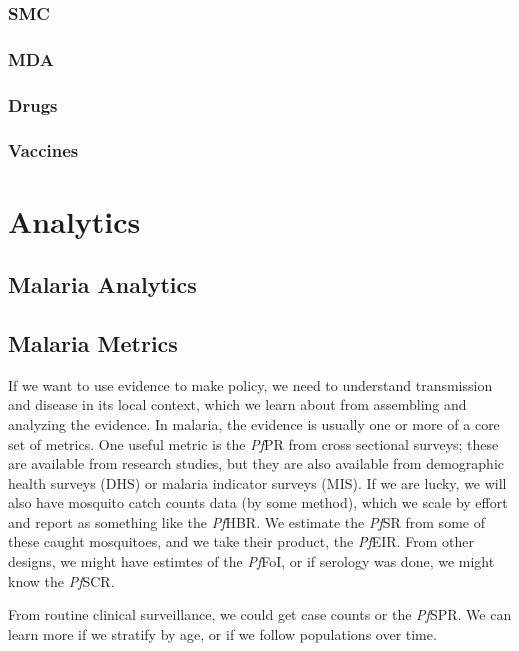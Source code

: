 \documentclass[
]{book}
\begin{document}
\section{SMC}\label{smc}

\section{MDA}\label{mda}

\section{Drugs}\label{drugs}

\section{Vaccines}\label{vaccines}

\part{Analytics}\label{part-analytics}

\chapter{Malaria Analytics}\label{malaria-analytics}

\chapter{Malaria Metrics}\label{malaria-metrics}

If we want to use evidence to make policy, we need to understand transmission and disease in its local context, which we learn about from assembling and analyzing the evidence. In malaria, the evidence is usually one or more of a core set of metrics. One useful metric is the \emph{Pf}PR from cross sectional surveys; these are available from research studies, but they are also available from demographic health surveys (DHS) or malaria indicator surveys (MIS). If we are lucky, we will also have mosquito catch counts data (by some method), which we scale by effort and report as something like the \emph{Pf}HBR. We estimate the \emph{Pf}SR from some of these caught mosquitoes, and we take their product, the \emph{Pf}EIR. From other designs, we might have estimtes of the \emph{Pf}FoI, or if serology was done, we might know the \emph{Pf}SCR.

From routine clinical surveillance, we could get case counts or the \emph{Pf}SPR. We can learn more if we stratify by age, or if we follow populations over time.
\end{document}

